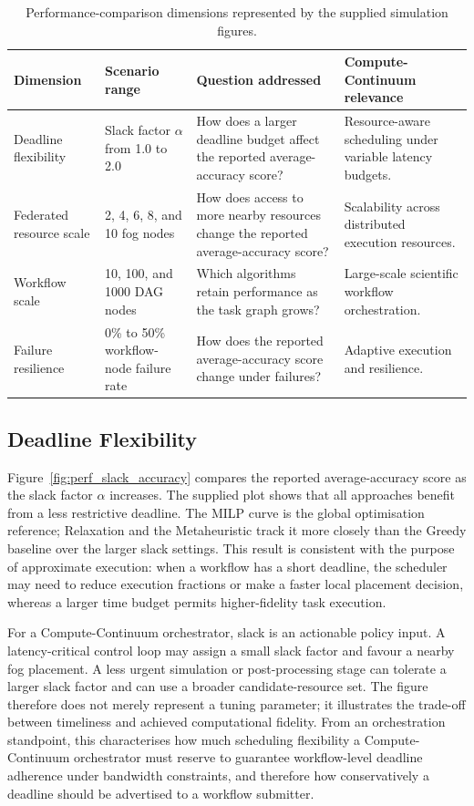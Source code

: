 \begin{table}[t]
\centering
\caption{Performance-comparison dimensions represented by the supplied simulation figures.}
\label{tab:performance_dimensions}
\small
\begin{tabular}{p{}p{}p{}p{}}
\toprule
\textbf{Dimension} & \textbf{Scenario range} & \textbf{Question addressed} & \textbf{Compute-Continuum relevance} \\
\midrule
Deadline flexibility & Slack factor $\alpha$ from 1.0 to 2.0 & How does a larger deadline budget affect the reported average-accuracy score? & Resource-aware scheduling under variable latency budgets. \\
\addlinespace
Federated resource scale & 2, 4, 6, 8, and 10 fog nodes & How does access to more nearby resources change the reported average-accuracy score? & Scalability across distributed execution resources. \\
\addlinespace
Workflow scale & 10, 100, and 1000 DAG nodes & Which algorithms retain performance as the task graph grows? & Large-scale scientific workflow orchestration. \\
\addlinespace
Failure resilience & 0\% to 50\% workflow-node failure rate & How does the reported average-accuracy score change under failures? & Adaptive execution and resilience. \\
\bottomrule
\end{tabular}
\end{table}

\subsection{Deadline Flexibility}

Figure~\ref{fig:perf_slack_accuracy} compares the reported average-accuracy score as the slack factor $\alpha$ increases. The supplied plot shows that all approaches benefit from a less restrictive deadline. The MILP curve is the global optimisation reference; Relaxation and the Metaheuristic track it more closely than the Greedy baseline over the larger slack settings. This result is consistent with the purpose of approximate execution: when a workflow has a short deadline, the scheduler may need to reduce execution fractions or make a faster local placement decision, whereas a larger time budget permits higher-fidelity task execution.


For a Compute-Continuum orchestrator, slack is an actionable policy input. A latency-critical control loop may assign a small slack factor and favour a nearby fog placement. A less urgent simulation or post-processing stage can tolerate a larger slack factor and can use a broader candidate-resource set. The figure therefore does not merely represent a tuning parameter; it illustrates the trade-off between timeliness and achieved computational fidelity. From an orchestration standpoint, this characterises how much scheduling flexibility a Compute-Continuum orchestrator must reserve to guarantee workflow-level deadline adherence under bandwidth constraints, and therefore how conservatively a deadline should be advertised to a workflow submitter.

